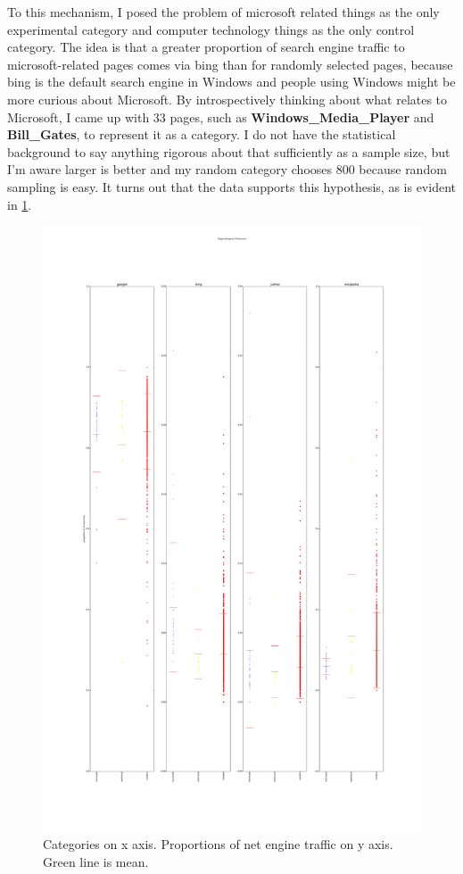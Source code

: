 \documentclass{article}
\begin{document}
To this mechanism, I posed the problem of microsoft related things as the only experimental category and computer technology things as the only control category. The idea is that a greater proportion of search engine traffic to microsoft-related pages comes via bing than for randomly selected pages, because bing is the default search engine in Windows and people using Windows might be more curious about Microsoft. By introspectively thinking about what relates to Microsoft, I came up with 33 pages, such as \textbf{Windows\_Media\_Player} and \textbf{Bill\_Gates}, to represent it as a category. I do not have the statistical background to say anything rigorous about that sufficiently as a sample size, but I’m aware larger is better and my random category chooses 800 because random sampling is easy. It turns out that the data supports this hypothesis, as is evident in \cref{fig:ms}.

\begin{figure}
    \includegraphics[width=\textwidth]{results/Microsoft_Bing_Engine_Engines_Coherence.pdf}
    \caption{Categories on x axis. Proportions of net engine traffic on y axis. Green line is mean.} \label{fig:ms}
\end{figure}
\end{document}
